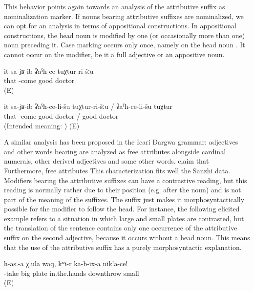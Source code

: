 This behavior points again towards an analysis of the attributive suffix as nominalization marker. If nouns bearing attributive suffixes are nominalized, we can opt for an analysis in terms of appositional constructions. In appositional constructions, the head noun is modified by one (or occasionally more than one) noun preceding it. Case marking occurs only once, namely on the head noun . It cannot occur on the modifier, be it a full adjective or an appositive noun.
%
\begin{exe}
	\ex	\label{ex:He went to a good doctor minor}
	\gll	it	sa-jʁ-ib	ʡaˁħ-ce	tuχtur-ri-šːu\\
		that	-come	good	doctor\\
	\glt	{} (E)

	\ex	\label{ex:He went to a good doctor ungrammatical minor}
	\gll	{*}	it	sa-jʁ-ib	ʡaˁħ-ce-li-šu	tuχtur-ri-šːu	/	ʡaˁħ-ce-li-šu	tuχtur\\
		{}	that	-come	good	doctor	/	good	doctor\\
	\glt	‎(Intended meaning: ) (E)
\end{exe}

A similar analysis has been proposed in the Icari Dargwa grammar: adjectives and other words bearing  are analyzed as free attributes alongside cardinal numerals, other derived adjectives and some other words. \citet[48, 129]{Sumbatova.Mutalov2003} claim that  Furthermore, free attributes  This characterization fits well the Sanzhi data. Modifiers bearing the attributive suffixes can have a contrastive reading, but this reading is normally rather due to their position (e.g. after the noun) and is not part of the meaning of the suffixes. The suffix just makes it morphosyntactically possible for the modifier to follow the head. For instance, the following elicited example refers to a situation in which large and small plates are contrasted, but the translation of the sentence contains only one occurrence of the attributive suffix on the second adjective, because it occurs without a head noun. This means that the use of the attributive suffix has a purely morphosyntactic explanation.
%
\begin{exe}
	\ex	\label{ex:Take the large plate, put away the small one minor}
	\gll	h-asː-a	χːula	waq,	kʷi-r	ka-b-ix-a	nik'a-ce!\\
		-take	big	plate	in.the.hands	downthrow	small\\
	\glt	{} (E)
\end{exe}

